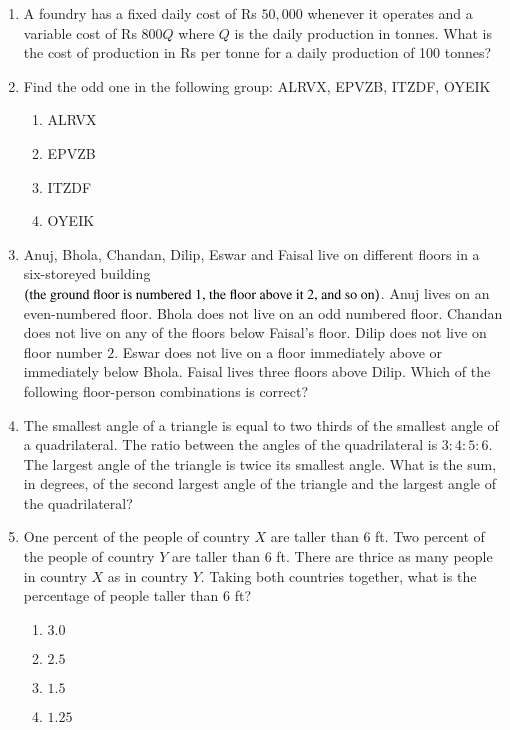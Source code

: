 \documentclass[journal,12pt,onecolumn]{IEEEtran}
\theoremstyle{remark}
\begin{document}
\begin{enumerate}
\item A foundry has a fixed daily cost of Rs $50,000$ whenever it operates and a variable cost of Rs $800Q$ where $Q$ is the daily production in tonnes. What is the cost of production in Rs per tonne for a daily production of 100 tonnes?

\item Find the odd one in the following group: ALRVX, EPVZB, ITZDF, OYEIK
\begin{enumerate}
\item ALRVX
\item EPVZB
\item ITZDF
\item OYEIK
\end{enumerate}

\item Anuj, Bhola, Chandan, Dilip, Eswar and Faisal live on different floors in a six-storeyed building$\left(\text{the ground floor is numbered 1, the floor above it 2, and so on}\right)$. Anuj lives on an even-numbered floor. Bhola does not live on an odd numbered floor. Chandan does not live on any of the floors below Faisal's floor. Dilip does not live on floor number $2$. Eswar does not live on a floor immediately above or immediately below Bhola. Faisal lives three floors above Dilip. Which of the following floor-person combinations is correct?\\
\begin{center}

\end{center}

\item The smallest angle of a triangle is equal to two thirds of the smallest angle of a quadrilateral. The ratio between the angles of the quadrilateral is $3:4:5:6$. The largest angle of the triangle is twice its smallest angle. What is the sum, in degrees, of the second largest angle of the triangle and the largest angle of the quadrilateral?

\item One percent of the people of country $X$ are taller than $6$ ft. Two percent of the people of country $Y$ are taller than $6$ ft. There are thrice as many people in country $X$ as in country $Y$. Taking both countries together, what is the percentage of people taller than $6$ ft?
\begin{enumerate}
\item $3.0$
\item $2.5$
\item $1.5$
\item $1.25$
\end{enumerate}


\end{enumerate}
\end{document}
